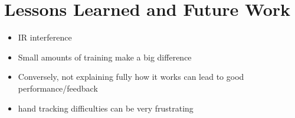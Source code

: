 \section{Lessons Learned and Future Work}

\begin{itemize}
    \item IR interference
    \item Small amounts of training make a big difference
    \item Conversely, not explaining fully how it works can lead to good performance/feedback
    \item hand tracking difficulties can be very frustrating
\end{itemize}
